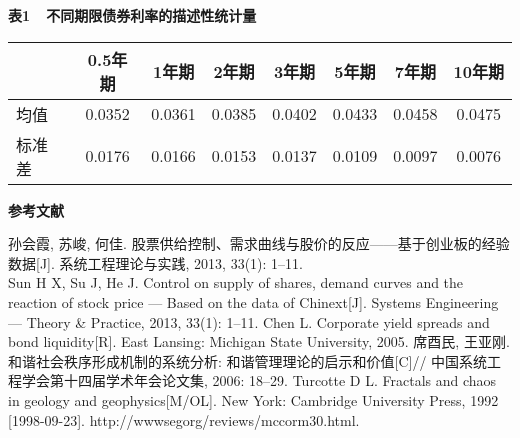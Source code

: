 \documentclass[a4paper, c5size, twoside]{ctexart}
\def\sz{\small \zihao{-5}}
\def\REFERENCE{\vspace*{.2in}
{\noindent\bf\heiti\zihao{5}参考文献} \vspace*{.1in}}
\begin{document}
\vspace{2mm}
\begin{center}{\sz
	{\textbf{表1\ \  不同期限债券利率的描述性统计量}}\\
	\begin{tabular}{lccccccc} \toprule
		& 0.5年期 &  1年期 &  2年期 &  3年期 &  5年期 & 7年期 & 10年期 \\
		\hline
		均值 & 0.0352   &0.0361  & 0.0385 & 0.0402   & 0.0433  & 0.0458  & 0.0475\\
		标准差  & 0.0176   & 0.0166  & 0.0153  &0.0137  & 0.0109  & 0.0097  &0.0076\\
		\bottomrule
\end{tabular}}
\end{center}\vspace{2mm}

\vspace{2mm}\begin{center}
\end{center}\vspace{2mm}



\REFERENCE
{\small \baselineskip 12pt
\begin{thebibliography}{99} 
	\vspace{-15mm}
	孙会霞, 苏峻, 何佳.
	股票供给控制、需求曲线与股价的反应------基于创业板的经验数据[J].
	系统工程理论与实践, 2013, 33(1): 1--11. \\
	Sun H X, Su J, He J. Control on supply of shares, demand curves
	and the reaction of stock price --- Based on the data of
	Chinext[J]. Systems Engineering --- Theory \& Practice, 2013,
	33(1): 1--11.%
	Chen L. Corporate yield spreads and bond liquidity[R]. East Lansing: Michigan State University, 2005. %
	席酉民, 王亚刚. 和谐社会秩序形成机制的系统分析:
	和谐管理理论的启示和价值[C]//
	中国系统工程学会第十四届学术年会论文集, 2006: 18--29.%
	Turcotte D L. Fractals and chaos in geology and
	geophysics[M/OL]. New York: Cambridge University Press, 1992
	[1998-09-23]. http://wwwsegorg/reviews/mccorm30.html.%
\end{thebibliography}}
\end{document}
